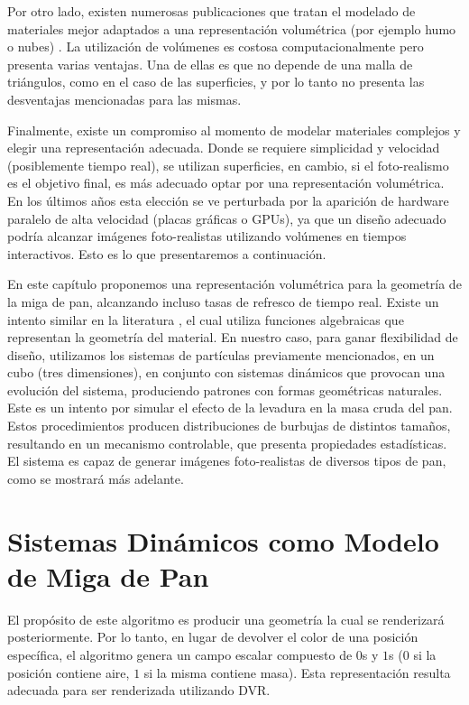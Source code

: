 Por otro lado, existen numerosas publicaciones que tratan el modelado de materiales mejor adaptados a una representación volumétrica (por ejemplo humo o nubes) \cite{Chentanez2011,Zhou2008}.
La utilización de volúmenes es costosa computacionalmente pero presenta varias ventajas. Una de ellas es que no depende de una malla de triángulos, como en el caso de las superficies, y por lo tanto no presenta las desventajas mencionadas para las mismas.

Finalmente, existe un compromiso al momento de modelar materiales complejos y elegir una representación adecuada.
Donde se requiere simplicidad y velocidad (posiblemente tiempo real), se utilizan superficies, en cambio, si el foto-realismo es el objetivo final, es más adecuado optar por una representación volumétrica.
En los últimos años esta elección se ve perturbada por la aparición de hardware paralelo de alta velocidad (placas gráficas o GPUs), ya que un diseño adecuado podría alcanzar imágenes foto-realistas utilizando volúmenes en tiempos interactivos.
Esto es lo que presentaremos a continuación.


En este capítulo proponemos una representación volumétrica para la geometría de la miga de pan, alcanzando incluso tasas de refresco de tiempo real.
Existe un intento similar en la literatura \cite{Perlin1989}, el cual utiliza funciones algebraicas que representan la geometría del material.
En nuestro caso, para ganar flexibilidad de diseño, utilizamos los sistemas de partículas previamente mencionados, en un cubo (tres dimensiones), en conjunto con sistemas dinámicos \cite{Strogatz2001} que provocan una evolución del sistema, produciendo patrones con formas geométricas naturales.
Este es un intento por simular el efecto de la levadura en la masa cruda del pan.
Estos procedimientos producen distribuciones de burbujas de distintos tamaños, resultando en un mecanismo controlable, que presenta propiedades estadísticas.
El sistema es capaz de generar imágenes foto-realistas de diversos tipos de pan, como se mostrará más adelante.

\section{Sistemas Dinámicos como Modelo de Miga de Pan}
El prop\'osito de este algoritmo es producir una geometr\'ia la cual se renderizar\'a posteriormente. Por lo tanto, en lugar de devolver el color de una posici\'on espec\'ifica, el algoritmo genera un campo escalar compuesto de $0$s y $1$s ($0$ si la posici\'on contiene aire, $1$ si la misma contiene masa).
Esta representaci\'on resulta adecuada para ser renderizada utilizando DVR.

